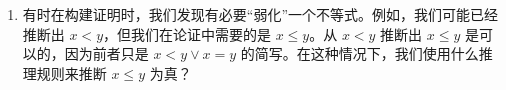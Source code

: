 \begin{enumerate}
   
   \wbvfill
   
   \rule{0pt}{0pt}
   
   \wbvfill
   
  \workbookpagebreak
  
  \item 
  
  有时在构建证明时，我们发现有必要“弱化”一个不等式。例如，我们可能已经推断出 $x < y$，但我们在论证中需要的是 $x \leq y$。从 $x < y$ 推断出 $x \leq y$ 是可以的，因为前者只是 $x<y \lor x=y$ 的简写。在这种情况下，我们使用什么推理规则来推断 $x \leq y$ 为真？
  
  \wbvfill
  
  \end{enumerate}